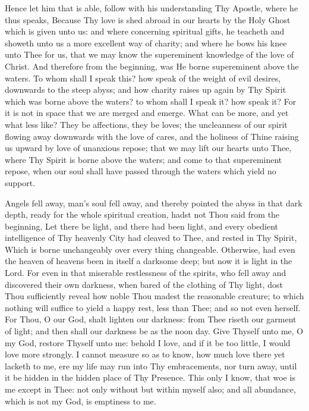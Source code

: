 \documentclass[b5paper,openright,12pt,twoside]{book}
\begin{document}
Hence let him that is able, follow with his understanding Thy Apostle,
where he thus speaks, Because Thy love is shed abroad in our hearts by
the Holy Ghost which is given unto us: and where concerning spiritual
gifts, he teacheth and showeth unto us a more excellent way of charity;
and where he bows his knee unto Thee for us, that we may know the
supereminent knowledge of the love of Christ. And therefore from the
beginning, was He borne supereminent above the waters. To whom shall I
speak this? how speak of the weight of evil desires, downwards to the
steep abyss; and how charity raises up again by Thy Spirit which was
borne above the waters? to whom shall I speak it? how speak it? For it
is not in space that we are merged and emerge. What can be more, and yet
what less like? They be affections, they be loves; the uncleanness
of our spirit flowing away downwards with the love of cares, and the
holiness of Thine raising us upward by love of unanxious repose; that
we may lift our hearts unto Thee, where Thy Spirit is borne above the
waters; and come to that supereminent repose, when our soul shall have
passed through the waters which yield no support.

Angels fell away, man's soul fell away, and thereby pointed the abyss in
that dark depth, ready for the whole spiritual creation, hadst not Thou
said from the beginning, Let there be light, and there had been light,
and every obedient intelligence of Thy heavenly City had cleaved to
Thee, and rested in Thy Spirit, Which is borne unchangeably over every
thing changeable. Otherwise, had even the heaven of heavens been in
itself a darksome deep; but now it is light in the Lord. For even in
that miserable restlessness of the spirits, who fell away and discovered
their own darkness, when bared of the clothing of Thy light, dost Thou
sufficiently reveal how noble Thou madest the reasonable creature; to
which nothing will suffice to yield a happy rest, less than Thee; and so
not even herself. For Thou, O our God, shalt lighten our darkness: from
Thee riseth our garment of light; and then shall our darkness be as
the noon day. Give Thyself unto me, O my God, restore Thyself unto me:
behold I love, and if it be too little, I would love more strongly. I
cannot measure so as to know, how much love there yet lacketh to me, ere
my life may run into Thy embracements, nor turn away, until it be hidden
in the hidden place of Thy Presence. This only I know, that woe is
me except in Thee: not only without but within myself also; and all
abundance, which is not my God, is emptiness to me.
\end{document}
